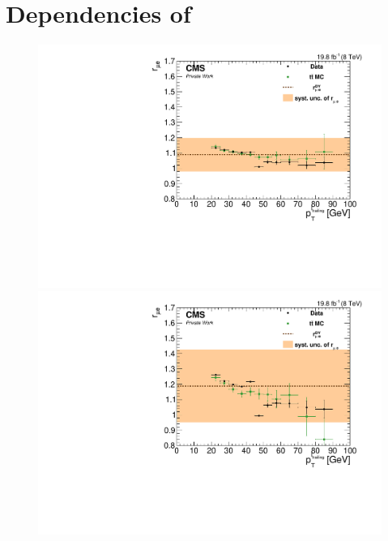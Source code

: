 \chapter{Dependencies of \rmue}
\label{app:rmue}
\begin{figure}[htbp]
\centering
\begin{minipage}[t]{0.49\textwidth}
  \includegraphics[width=\textwidth]{plots/BG/rmue/8TeVrRatioDataVsMCControl_pt1_Central_Full2012.pdf}
\end{minipage}
\begin{minipage}[t]{0.49\textwidth}
\includegraphics[width=\textwidth]{plots/BG/rmue/8TeVrRatioDataVsMCControl_pt1_Forward_Full2012.pdf}
\end{minipage}
\begin{minipage}[t]{0.49\textwidth}

\end{minipage}
\end{figure}
